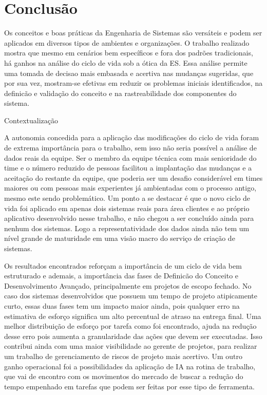 
\chapter{Conclusão}\label{chap:conclusao}
	
	Os conceitos e boas práticas da Engenharia de Sistemas são versáteis e podem ser aplicados em diversos tipos de ambientes e organizações. O trabalho realizado mostra
	que mesmo em cenários bem específicos e fora dos padrões tradicionais, há ganhos na análise do ciclo de vida sob a ótica da ES. Essa análise permite uma tomada de decisao mais embasada e acertiva
	nas mudanças sugeridas, que por sua vez, mostram-se efetivas em reduzir os problemas iniciais identificados, na definicão e validação do conceito e na rastreabilidade dos componentes do sistema.

	{\color{red}Contextualização}
	
	A autonomia concedida para a aplicação das modificações do ciclo de vida foram de extrema importância para o trabalho, sem isso não seria possível a análise de dados reais da equipe. Ser o membro da equipe
	técnica com mais senioridade do time e o número reduzido de pessoas facilitou a implantação das mudanças e a aceitação do restante da equipe, que poderia ser um desafio considerável
	em times maiores ou com pessoas mais experientes já ambientadas com o processo antigo, mesmo este sendo problemático. Um ponto a se destacar é que o novo ciclo de vida foi aplicado em apenas dois sistemas reais
	para área clientes e ao próprio aplicativo desenvolvido nesse trabalho, e não chegou a ser concluído ainda para nenhum dos sistemas. Logo a representatividade dos dados ainda não tem um nível grande de maturidade
	em uma visão macro do serviço de criação de sistemas.

	Os resultados encontrados reforçam a importância de um ciclo de vida bem estruturado e ademais, a importância das fases de Definicão do Conceito e Desenvolvimento Avançado, principalmente em projetos de escopo fechado.
	No caso dos sistemas desenvolvidos que possuem um tempo de projeto atipicamente curto, essas duas fases tem um impacto maior ainda, pois qualquer erro na estimativa de esforço significa um alto percentual de atraso na entrega final.
	Uma melhor distribuição de esforço por tarefa como foi encontrado, ajuda na redução desse erro pois aumenta a granularidade das ações que devem ser executadas. Isso contribui ainda com uma maior visibilidade ao gerente de projetos, para realizar um trabalho de gerenciamento de riscos de projeto mais acertivo.
	Um outro ganho operacional foi a possibilidades da aplicação de IA na rotina de trabalho, que vai de encontro com os movimentos do mercado de buscar a redução do tempo empenhado em tarefas que podem ser feitas por esse tipo de ferramenta.

